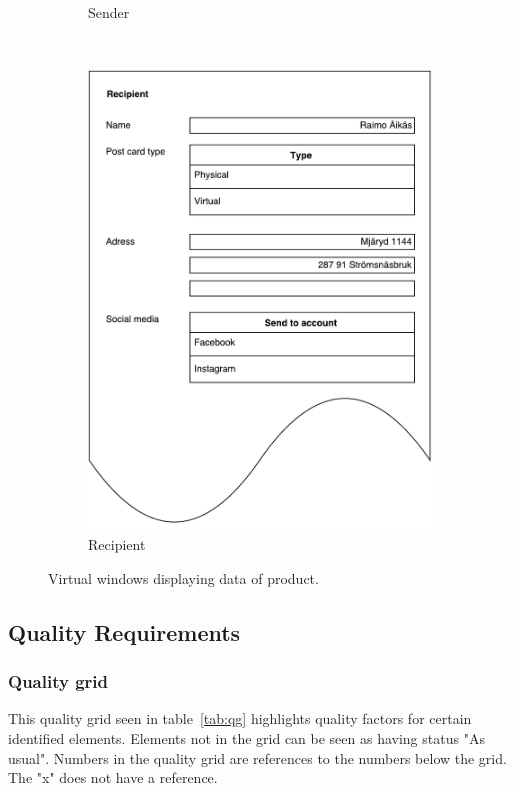 \documentclass[10pt,a4paper]{article}
\begin{document}
\begin{figure}[!ht]
\begin{subfigure}{0.3\textwidth}
\caption{Sender}
\label{fig:virtualwindows_sender}
\end{subfigure}\hfill
~
\begin{subfigure}{0.3\textwidth}
\includegraphics[width=\linewidth]{Data_figures/virtualwindows_recipient.pdf}
\caption{Recipient}
\label{fig:virtualwindows_recipient}
\end{subfigure}
\caption{Virtual windows displaying data of product.}
\label{fig:vw}

\end{figure}



\subsection{Quality Requirements}



\subsubsection{Quality grid}
This quality grid seen in table~\ref{tab:qg} highlights quality factors for certain identified elements. Elements not in the grid can be seen as having status "As usual". Numbers in the quality grid are references to the numbers below the grid. The "x" does not have a reference.
\end{document}

